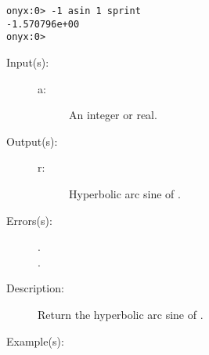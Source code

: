 \begin{description}
\begin{description}
\begin{verbatim}
onyx:0> -1 asin 1 sprint
-1.570796e+00
onyx:0>
		\end{verbatim}
	\end{description}
\label{systemdict:asinh}
\item[{\onyxop{a}{asinh}{r}}: ]
	\begin{description}\item[]
	\item[Input(s): ]
		\begin{description}\item[]
		\item[a: ]
			An integer or real.
		\end{description}
	\item[Output(s): ]
		\begin{description}\item[]
		\item[r: ]
			Hyperbolic arc sine of .
		\end{description}
	\item[Errors(s): ]
		\begin{description}\item[]
		\item[.]
		\item[.]
		\end{description}
	\item[Description: ]
		Return the hyperbolic arc sine of .
	\item[Example(s): ]\begin{verbatim}


\end{verbatim}
\end{description}
\end{description}
